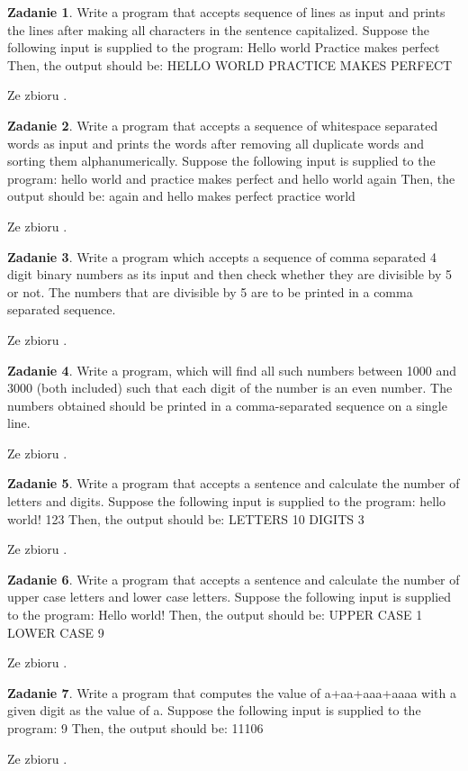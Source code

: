\documentclass[11pt]{article}
\theoremstyle{definition}
\newtheorem{zadanie}{Zadanie}
\newcommand{\fromA}{\small Ze zbioru \cite{python100}.}
\begin{document}
\begin{zadanie}
Write a program that accepts sequence of lines as input and prints the lines after making all characters in the sentence capitalized.
Suppose the following input is supplied to the program:
Hello world
Practice makes perfect
Then, the output should be:
HELLO WORLD
PRACTICE MAKES PERFECT

\fromA
\end{zadanie}

\begin{zadanie}
Write a program that accepts a sequence of whitespace separated words as input and prints the words after removing all duplicate words and sorting them alphanumerically.
Suppose the following input is supplied to the program:
hello world and practice makes perfect and hello world again
Then, the output should be:
again and hello makes perfect practice world

\fromA
\end{zadanie}
\begin{zadanie}
Write a program which accepts a sequence of comma separated 4 digit binary numbers as its input and then check whether they are divisible by 5 or not. The numbers that are divisible by 5 are to be printed in a comma separated sequence.

\fromA
\end{zadanie}
\begin{zadanie}
Write a program, which will find all such numbers between 1000 and 3000 (both included) such that each digit of the number is an even number.
The numbers obtained should be printed in a comma-separated sequence on a single line.

\fromA
\end{zadanie}
\begin{zadanie}
Write a program that accepts a sentence and calculate the number of letters and digits.
Suppose the following input is supplied to the program:
hello world! 123
Then, the output should be:
LETTERS 10
DIGITS 3

\fromA
\end{zadanie}
\begin{zadanie}
Write a program that accepts a sentence and calculate the number of upper case letters and lower case letters.
Suppose the following input is supplied to the program:
Hello world!
Then, the output should be:
UPPER CASE 1
LOWER CASE 9

\fromA
\end{zadanie}
\begin{zadanie}
Write a program that computes the value of a+aa+aaa+aaaa with a given digit as the value of a.
Suppose the following input is supplied to the program:
9
Then, the output should be:
11106

\fromA
\end{zadanie}
\end{document}
